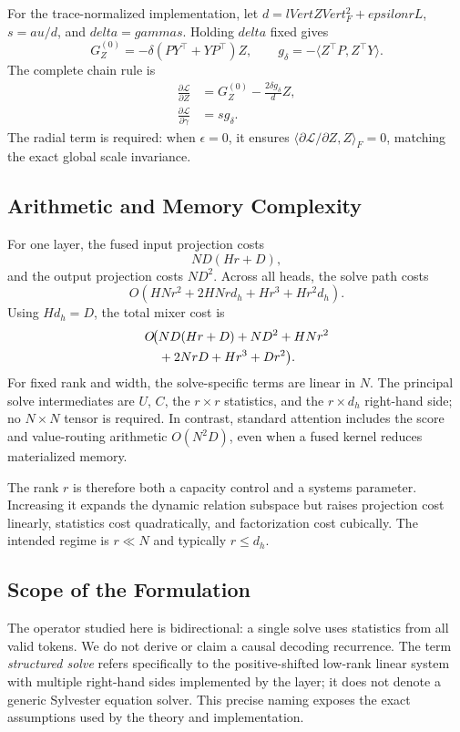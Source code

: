 For the trace-normalized implementation, let $d=lVert Z
Vert_F^2+epsilon rL$, $s=	au/d$, and $delta=gamma s$. Holding $delta$ fixed gives
\[
  G_Z^{(0)}=-\delta(PY^\top+YP^\top)Z,
  \qquad
  g_\delta=-\langle Z^\top P,Z^\top Y\rangle.
\]
The complete chain rule is
\begin{align}
  \frac{\partial\mathcal L}{\partial Z}
  &=G_Z^{(0)}-\frac{2\delta g_\delta}{d}Z,\\
  \frac{\partial\mathcal L}{\partial\gamma}
  &=s g_\delta.
\end{align}
The radial term is required: when $\epsilon=0$, it ensures $\langle \partial\mathcal L/\partial Z,Z\rangle_F=0$, matching the exact global scale invariance.

\subsection{Arithmetic and Memory Complexity}

For one layer, the fused input projection costs
\[
  ND(Hr+D),
\]
and the output projection costs $ND^2$. Across all heads, the solve path costs
\begin{equation}
  O\!\left(
    HNr^2+2HNrd_h+Hr^3+Hr^2d_h
  \right).
  \label{eq:solve_complexity}
\end{equation}
Using $Hd_h=D$, the total mixer cost is
\begin{align}
  O\!\big(&ND(Hr+D)+ND^2+HNr^2\notag\\
           &+2NrD+Hr^3+Dr^2\big).
  \label{eq:total_complexity}
\end{align}
For fixed rank and width, the solve-specific terms are linear in $N$. The principal solve intermediates are $U$, $C$, the $r\times r$ statistics, and the $r\times d_h$ right-hand side; no $N\times N$ tensor is required. In contrast, standard attention includes the score and value-routing arithmetic $O(N^2D)$, even when a fused kernel reduces materialized memory.

The rank $r$ is therefore both a capacity control and a systems parameter. Increasing it expands the dynamic relation subspace but raises projection cost linearly, statistics cost quadratically, and factorization cost cubically. The intended regime is $r\ll N$ and typically $r\leq d_h$.

\subsection{Scope of the Formulation}

The operator studied here is bidirectional: a single solve uses statistics from all valid tokens. We do not derive or claim a causal decoding recurrence. The term \emph{structured solve} refers specifically to the positive-shifted low-rank linear system with multiple right-hand sides implemented by the layer; it does not denote a generic Sylvester equation solver. This precise naming exposes the exact assumptions used by the theory and implementation.

